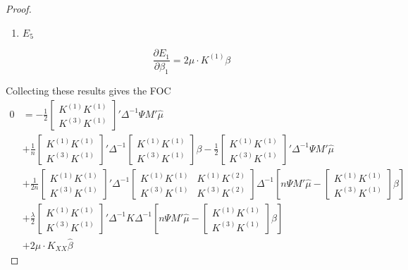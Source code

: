 \begin{proof}
\begin{enumerate}
    \item  $E_5$
    
    $$
    \frac{\partial E_1}{\partial \beta_1}=2\mu\cdot K^{(1)}\beta
    $$
    
\end{enumerate}

Collecting these results gives the FOC
\begin{align}
    0&= -\frac{1}{2} \begin{bmatrix}K^{(1)}K^{(1)} \\ K^{(3)}K^{(1)} \end{bmatrix}'\Delta^{-1}\Psi M'\hat{\mu} \\
    &+\frac{1}{n} \begin{bmatrix} K^{(1)} K^{(1)} \\ K^{(3)} K^{(1)}\end{bmatrix}'\Delta^{-1}\begin{bmatrix} K^{(1)} K^{(1)} \\ K^{(3)} K^{(1)}\end{bmatrix}\beta-\frac{1}{2}\begin{bmatrix} K^{(1)} K^{(1)} \\ K^{(3)} K^{(1)}\end{bmatrix}'\Delta^{-1} \Psi M'\hat{\mu} \\
    &+\frac{1}{2n}\begin{bmatrix}K^{(1)}K^{(1)} \\ K^{(3)}K^{(1)} \end{bmatrix}'    
\Delta^{-1}
       \begin{bmatrix} K^{(1)}K^{(1)} & K^{(1)} K^{(2)} \\ K^{(3)} K^{(1)} & K^{(3)}K^{(2)}\end{bmatrix}
        \Delta^{-1}
        \left[n\Psi M' \hat{\mu} -\begin{bmatrix}K^{(1)}K^{(1)} \\ K^{(3)}K^{(1)} \end{bmatrix} \beta\right] \\
        &+\frac{\lambda}{2}\begin{bmatrix}K^{(1)}K^{(1)} \\ K^{(3)}K^{(1)} \end{bmatrix}'   
\Delta^{-1}
       K
        \Delta^{-1}
        \left[n\Psi M' \hat{\mu} -\begin{bmatrix}K^{(1)}K^{(1)} \\ K^{(3)}K^{(1)} \end{bmatrix} \beta\right] \\
        &+2\mu\cdot K_{XX}\hat{\beta}
\end{align}


\end{proof}
